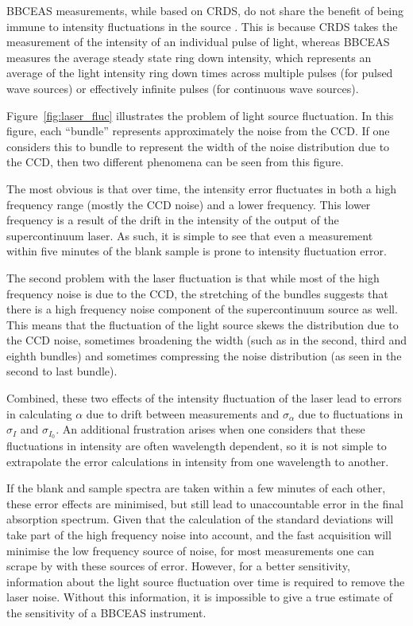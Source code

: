 \ac{BBCEAS} measurements, while based on \ac{CRDS}, do not share the benefit of
being immune to intensity fluctuations in the source \cite{Berden:2009wk}. This
is because \ac{CRDS} takes the measurement of the intensity of an individual
pulse of light, whereas \ac{BBCEAS} measures the average steady state ring down
intensity, which represents an average of the light intensity ring down times
across multiple pulses (for pulsed wave sources) or effectively infinite pulses
(for continuous wave sources).

Figure~\ref{fig:laser_fluc} illustrates the problem of light source
fluctuation. In this figure, each ``bundle'' represents approximately the
noise from the \ac{CCD}. If one considers this to bundle to represent the
width of the noise distribution due to the \ac{CCD}, then two different
phenomena can be seen from this figure.

The most obvious is that over time, the intensity error fluctuates in both a
high frequency range (mostly the \ac{CCD} noise) and a lower frequency. This
lower frequency is a result of the drift in the intensity of the output of the
supercontinuum laser. As such, it is simple to see that even a measurement
within five minutes of the blank sample is prone to intensity fluctuation
error.

The second problem with the laser fluctuation is that while most of the high
frequency noise is due to the \ac{CCD}, the stretching of the bundles suggests
that there is a high frequency noise component of the supercontinuum source as
well. This means that the fluctuation of the light source skews the
distribution due to the \ac{CCD} noise, sometimes broadening the width (such as
in the second, third and eighth bundles) and sometimes compressing the noise
distribution (as seen in the second to last bundle).

Combined, these two effects of the intensity fluctuation of the laser lead to
errors in calculating $\alpha$ due to drift between measurements and
$\sigma_{\alpha}$ due to fluctuations in $\sigma_{I}$ and $\sigma_{I_0}$. An
additional frustration arises when one considers that these fluctuations in
intensity are often wavelength dependent, so it is not simple to extrapolate
the error calculations in intensity from one wavelength to another.

If the blank and sample spectra are taken within a few minutes of each other,
these error effects are minimised, but still lead to unaccountable error in the
final absorption spectrum. Given that the calculation of the standard
deviations will take part of the high frequency noise into account, and the
fast acquisition will minimise the low frequency source of noise, for most
measurements one can scrape by with these sources of error. However, for a
better sensitivity, information about the light source fluctuation over time is
required to remove the laser noise. Without this information, it is impossible
to give a true estimate of the sensitivity of a \ac{BBCEAS} instrument.

